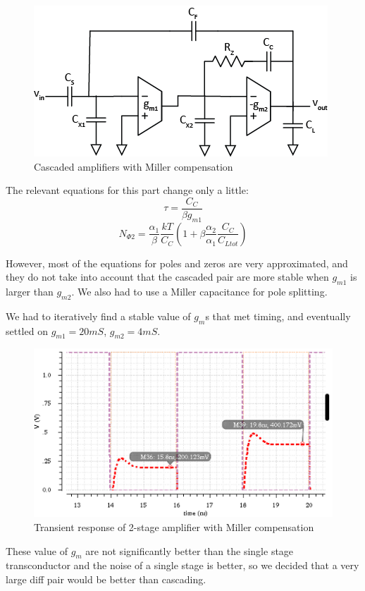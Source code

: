 \documentclass[conference]{IEEEtran}
\begin{document}
\begin{figure}[h]
\centering
\includegraphics[width=0.7\linewidth]{illustrator/integrator2}
\caption{Cascaded amplifiers with Miller compensation}
\label{int2}
\end{figure}
 
The relevant equations for this part change only a little:
$$\tau = \frac{C_C}{\beta g_{m1}}$$
$$N_{\Phi 2} = \frac{\alpha_1}{\beta} \frac{kT}{C_C} \left( 1+\beta \frac{\alpha_2}{\alpha_1} \frac{C_C}{C_{Ltot}} \right)$$

However, most of the equations for poles and zeros are very approximated, and they do not take into account that the cascaded pair are more stable when $g_{m1}$ is larger than $g_{m2}$. We also had to use a Miller capacitance for pole splitting.

We had to iteratively find a stable value of $g_m$s that met timing, and eventually settled on $g_{m1}=20mS$, $g_{m2}=4mS$.

\begin{figure}[h]
\centering
\includegraphics[width=\linewidth]{img/cascaded-tran}
\caption{Transient response of 2-stage amplifier with Miller compensation}
\label{cascaded-tran}
\end{figure}

These value of $g_m$ are not significantly better than the single stage transconductor and the noise of a single stage is better, so we decided that a very large diff pair would be better than cascading.
\end{document}
